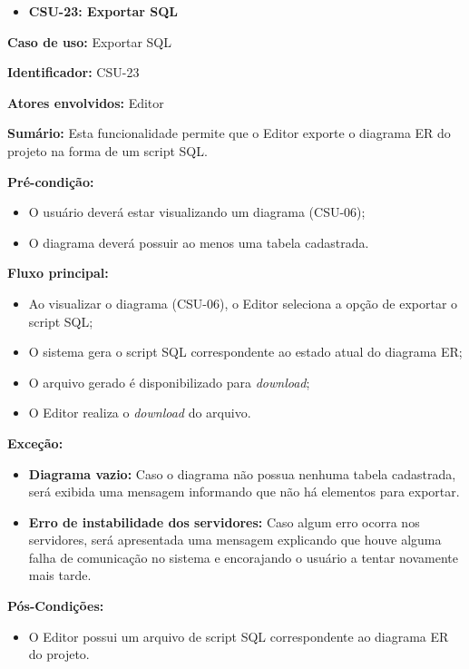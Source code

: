 \vspace{1em}

\begin{itemize}
    \item \textbf{CSU-23: Exportar SQL}
\end{itemize}

\textbf{Caso de uso:} Exportar SQL

\textbf{Identificador:} CSU-23

\textbf{Atores envolvidos:} Editor

\textbf{Sumário:} Esta funcionalidade permite que o Editor exporte o diagrama ER do projeto na forma de um script SQL.

\textbf{Pré-condição:}
\begin{itemize}
    \item O usuário deverá estar visualizando um diagrama (CSU-06);
    \item O diagrama deverá possuir ao menos uma tabela cadastrada.
\end{itemize}

\textbf{Fluxo principal:}
\begin{itemize}
    \item Ao visualizar o diagrama (CSU-06), o Editor seleciona a opção de exportar o script SQL;
    \item O sistema gera o script SQL correspondente ao estado atual do diagrama ER;
    \item O arquivo gerado é disponibilizado para \textit{download};
    \item O Editor realiza o \textit{download} do arquivo.
\end{itemize}

\textbf{Exceção:}
\begin{itemize}
    \item \textbf{Diagrama vazio:} Caso o diagrama não possua nenhuma tabela cadastrada, será exibida uma mensagem informando que não há elementos para exportar.
    \item \textbf{Erro de instabilidade dos servidores:} Caso algum erro ocorra nos servidores, será apresentada uma mensagem explicando que houve alguma falha de comunicação no sistema e encorajando o usuário a tentar novamente mais tarde.
\end{itemize}

\textbf{Pós-Condições:}
\begin{itemize}
    \item O Editor possui um arquivo de script SQL correspondente ao diagrama ER do projeto.
\end{itemize}

